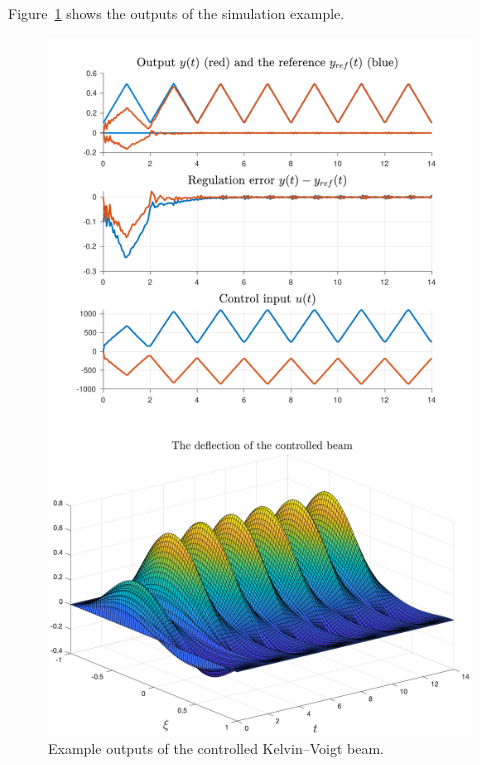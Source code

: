 \documentclass[11pt, a4paper]{amsart}
\theoremstyle{definition}
\numberwithin{equation}{section}
\begin{document}
Figure~\ref{fig:BeamKV} shows the outputs of the simulation example.

\begin{figure}[h!]
  \begin{minipage}{0.48\linewidth}
    \begin{flushleft}
      \includegraphics[width=0.9\linewidth]{BKVoutputs.pdf}
    \end{flushleft}
  \end{minipage}
  \begin{minipage}{0.48\linewidth}
    \begin{flushright}
      \includegraphics[width=\linewidth]{BKVprofile.png}
    \end{flushright}
  \end{minipage}
    \caption{Example outputs of the controlled Kelvin--Voigt beam.}
  \label{fig:BeamKV}
\end{figure}
\end{document}
